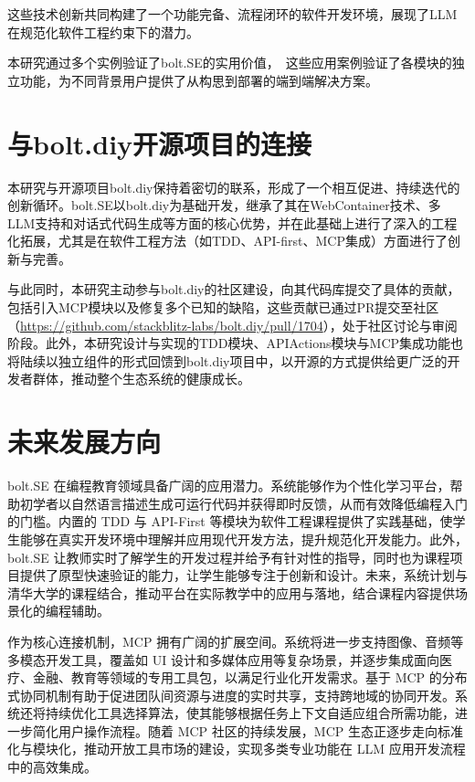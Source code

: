 这些技术创新共同构建了一个功能完备、流程闭环的软件开发环境，展现了LLM在规范化软件工程约束下的潜力。

本研究通过多个实例验证了bolt.SE的实用价值，　这些应用案例验证了各模块的独立功能，为不同背景用户提供了从构思到部署的端到端解决方案。

\section{与bolt.diy开源项目的连接}

本研究与开源项目bolt.diy保持着密切的联系，形成了一个相互促进、持续迭代的创新循环。bolt.SE以bolt.diy为基础开发，继承了其在WebContainer技术、多LLM支持和对话式代码生成等方面的核心优势，并在此基础上进行了深入的工程化拓展，尤其是在软件工程方法（如TDD、API-first、MCP集成）方面进行了创新与完善。

与此同时，本研究主动参与bolt.diy的社区建设，向其代码库提交了具体的贡献，包括引入MCP模块以及修复多个已知的缺陷，这些贡献已通过PR提交至社区（\href{https://github.com/stackblitz-labs/bolt.diy/pull/1704}{https://github.com/stackblitz-labs/bolt.diy/pull/1704}），处于社区讨论与审阅阶段。此外，本研究设计与实现的TDD模块、APIActions模块与MCP集成功能也将陆续以独立组件的形式回馈到bolt.diy项目中，以开源的方式提供给更广泛的开发者群体，推动整个生态系统的健康成长。

\section{未来发展方向}

bolt.SE 在编程教育领域具备广阔的应用潜力。系统能够作为个性化学习平台，帮助初学者以自然语言描述生成可运行代码并获得即时反馈，从而有效降低编程入门的门槛。内置的 TDD 与 API-First 等模块为软件工程课程提供了实践基础，使学生能够在真实开发环境中理解并应用现代开发方法，提升规范化开发能力。此外，bolt.SE 让教师实时了解学生的开发过程并给予有针对性的指导，同时也为课程项目提供了原型快速验证的能力，让学生能够专注于创新和设计。未来，系统计划与清华大学的课程结合，推动平台在实际教学中的应用与落地，结合课程内容提供场景化的编程辅助。

作为核心连接机制，MCP 拥有广阔的扩展空间。系统将进一步支持图像、音频等多模态开发工具，覆盖如 UI 设计和多媒体应用等复杂场景，并逐步集成面向医疗、金融、教育等领域的专用工具包，以满足行业化开发需求。基于 MCP 的分布式协同机制有助于促进团队间资源与进度的实时共享，支持跨地域的协同开发。系统还将持续优化工具选择算法，使其能够根据任务上下文自适应组合所需功能，进一步简化用户操作流程。随着 MCP 社区的持续发展，MCP 生态正逐步走向标准化与模块化，推动开放工具市场的建设，实现多类专业功能在 LLM 应用开发流程中的高效集成。

